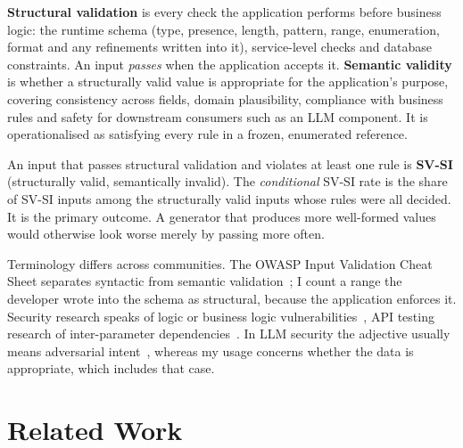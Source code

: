 \documentclass[conference]{IEEEtran}
\begin{document}
\textbf{Structural validation} is every check the application performs before business logic: the
runtime schema (type, presence, length, pattern, range, enumeration, format and any refinements written
into it), service-level checks and database constraints. An input \emph{passes} when the application
accepts it. \textbf{Semantic validity} is whether a structurally valid value is appropriate for the
application's purpose, covering consistency across fields, domain plausibility, compliance with business
rules and safety for downstream consumers such as an LLM component. It is operationalised as satisfying
every rule in a frozen, enumerated reference.

An input that passes structural validation and violates at least one rule is \textbf{SV-SI}
(structurally valid, semantically invalid). The \emph{conditional} SV-SI rate is the share of SV-SI
inputs among the structurally valid inputs whose rules were all decided. It is the primary outcome. A
generator that produces more well-formed values would otherwise look worse merely by passing more
often.

Terminology differs across communities. The OWASP Input Validation Cheat Sheet separates syntactic from
semantic validation~\cite{owasp2026inputvalidation}; I count a range the developer wrote into the schema
as structural, because the application enforces it. Security research speaks of logic or business logic
vulnerabilities~\cite{felmetsger2010waler,pellegrino2014logicflaws,metin2025blv}, API testing research of
inter-parameter dependencies~\cite{martinlopez2022idl,martinlopez2019catalogue}. In LLM
security the adjective usually means adversarial intent~\cite{singh2026injectioninteraction}, whereas my
usage concerns whether the data is appropriate, which includes that case.

\section{Related Work}
\label{sec:related}
\end{document}
